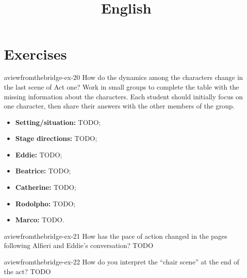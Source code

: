 \documentclass[preview]{standalone}
\begin{document}
\title{English}
\genpage

\section{Exercises}

\begin{snippetexercise}{aviewfromthebridge-ex-20}
{How do the dynamics among the characters change in the last scene of Act one? Work in small
groups to complete the table with the missing information about the characters. Each student
should initially focus on one character, then share their answers with the other members of the
group.}
\begin{itemize}
    \item \textbf{Setting/situation:} TODO;
    \item \textbf{Stage directions:} TODO;
    \item \textbf{Eddie:} TODO;
    \item \textbf{Beatrice:} TODO;
    \item \textbf{Catherine:} TODO;
    \item \textbf{Rodolpho:} TODO;
    \item \textbf{Marco:} TODO.
\end{itemize}
\end{snippetexercise}

\begin{snippetexercise}{aviewfromthebridge-ex-21}
{How has the pace of action changed in the pages following Alfieri and Eddie's conversation?}
TODO
\end{snippetexercise}

\begin{snippetexercise}{aviewfromthebridge-ex-22}
{How do you interpret the “chair scene” at the end of the act?}
TODO
\end{snippetexercise}
\end{document}
